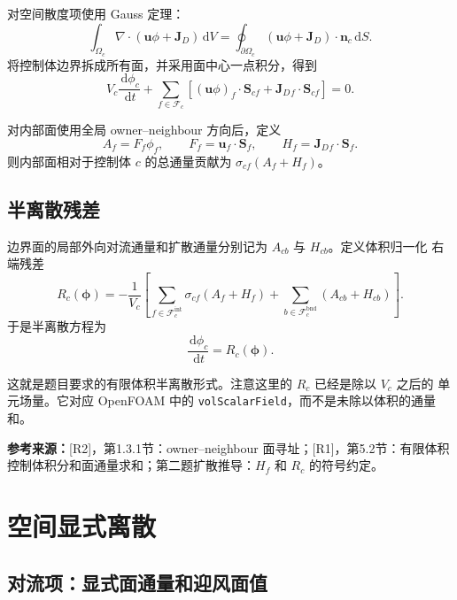 \documentclass[UTF8,12pt,a4paper]{ctexart}
\numberwithin{equation}{section}
\newcommand{\Rone}{\textnormal{[R1]}}
\newcommand{\Rtwo}{\textnormal{[R2]}}
\newcommand{\source}[1]{%
  \par\smallskip
  \noindent\colorbox{sourcebg}{%
    \parbox{0.955\linewidth}{\raggedright\footnotesize\color{sourcegray}\textbf{参考来源：}#1}%
  }
  \par\smallskip
}
\newcommand{\dd}{\,\mathrm d}
\newcommand{\Sf}{\bm S}
\newcommand{\uf}{\bm u}
\newcommand{\Jd}{\bm J_D}
\begin{document}
对空间散度项使用 Gauss 定理：
\begin{equation}
  \int_{\Omega_c}\nabla\cdot(\uf\phi+\Jd)\dd V
  =
  \oint_{\partial\Omega_c}(\uf\phi+\Jd)\cdot\bm n_c\dd S.
  \label{eq:gauss}
\end{equation}
将控制体边界拆成所有面，并采用面中心一点积分，得到
\begin{equation}
  V_c\frac{\dd\phi_c}{\dd t}
  +
  \sum_{f\in\mathcal F_c}
  \left[
  (\uf\phi)_f\cdot\Sf_{cf}
  +
  \Jd{}_{f}\cdot\Sf_{cf}
  \right]
  =
  0.
  \label{eq:local_flux_sum}
\end{equation}

对内部面使用全局 owner--neighbour 方向后，定义
\begin{equation}
  A_f=F_f\phi_f,
  \qquad
  F_f=\uf_f\cdot\Sf_f,
  \qquad
  H_f=\Jd{}_{f}\cdot\Sf_f.
  \label{eq:face_flux_definitions}
\end{equation}
则内部面相对于控制体 $c$ 的总通量贡献为 $\sigma_{cf}(A_f+H_f)$。

\subsection{半离散残差}

边界面的局部外向对流通量和扩散通量分别记为 $A_{cb}$ 与 $H_{cb}$。定义体积归一化
右端残差
\begin{equation}
  \boxed{
  R_c(\bm\phi)
  =
  -\frac{1}{V_c}
  \left[
  \sum_{f\in\mathcal F_c^{\mathrm{int}}}
  \sigma_{cf}(A_f+H_f)
  +
  \sum_{b\in\mathcal F_c^{\mathrm{bnd}}}
  (A_{cb}+H_{cb})
  \right].}
  \label{eq:residual}
\end{equation}
于是半离散方程为
\begin{equation}
  \boxed{
  \frac{\dd\phi_c}{\dd t}=R_c(\bm\phi).}
  \label{eq:semi_discrete}
\end{equation}

这就是题目要求的有限体积半离散形式。注意这里的 $R_c$ 已经是除以 $V_c$ 之后的
单元场量。它对应 OpenFOAM 中的 \texttt{volScalarField}，而不是未除以体积的通量和。

\source{\Rtwo，第1.3.1节：owner--neighbour 面寻址；\Rone，第5.2节：有限体积
控制体积分和面通量求和；第二题扩散推导：$H_f$ 和 $R_c$ 的符号约定。}

\section{空间显式离散}

\subsection{对流项：显式面通量和迎风面值}
\end{document}
